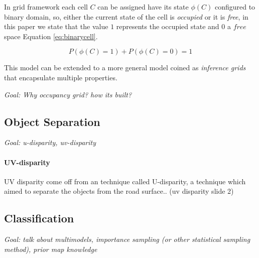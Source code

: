In grid framework each cell $C$ can be assigned have its state $\phi(C)$ configured to binary domain, so, either the current state of the cell is \textit{occupied} or it is \textit{free}, in this paper we state that the value $1$ represents the occupied state and $0$ a $free$ space Equation \ref{eq:binarycell}.

\begin{equation}
P(\phi(C)=1) + P(\phi(C)=0) = 1
\label{eq:binarycell}
\end{equation}

This model can be extended to a more general model coined as \textit{inference grids} that encapsulate multiple properties\cite{Elfes:1989:OGP:916528}.

\textit{Goal: Why occupancy grid? how its built? }

\subsection{Object Separation}

\textit{Goal: u-disparity, uv-disparity}

\paragraph*{UV-disparity} 

UV disparity come off from an technique called U-disparity, a technique which aimed to separate the objects from the road surface.. (uv disparity slide 2)


\subsection{Classification}

\textit{Goal: talk about multimodels, importance sampling (or other statistical sampling method), prior map knowledge }

